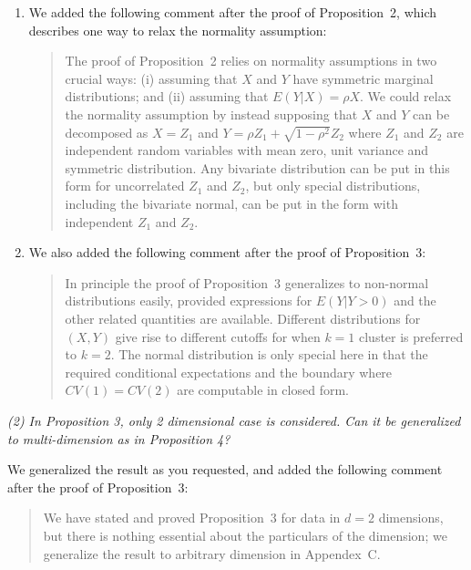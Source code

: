 \documentclass[11pt]{article}
\begin{document}
\begin{enumerate}
\item We added the following comment after the proof of Proposition~2, which
describes one way to relax the normality assumption:

\begin{quote}
The proof of Proposition~2 relies on normality assumptions
in two crucial ways: (i) assuming that $X$ and $Y$ have symmetric marginal
distributions; and (ii) assuming that $E(Y|X) = \rho X$. We could relax the
normality assumption by instead supposing that $X$ and $Y$ can be decomposed
as $X = Z_1$ and $Y = \rho Z_1 + \sqrt{1-\rho^2}Z_2$ where $Z_1$ and $Z_2$ are
independent random variables with mean zero, unit variance and symmetric
distribution. Any bivariate distribution can be put in this form for
uncorrelated $Z_1$ and $Z_2$, but only special distributions, including the
bivariate normal, can be put in the form with independent $Z_1$ and $Z_2$.
\end{quote}

\item We also added the following comment after the proof of Proposition~3:

\begin{quote}
In principle the proof of Proposition~3 generalizes to non-normal
distributions easily, provided expressions for $E(Y | Y > 0)$ and the other
related quantities are available. Different distributions for $(X,Y)$ give
rise to different cutoffs for when $k = 1$ cluster is preferred to $k = 2$.
The normal distribution is only special here in that the required conditional
expectations and the boundary where $CV(1) = CV(2)$ are computable in closed
form. 
\end{quote}

\end{enumerate}


\emph{(2) In Proposition 3, only 2 dimensional case is considered. Can
it be generalized to multi-dimension as in Proposition 4?}

We generalized the result as you requested, and added the following
comment after the proof of Proposition~3:

\begin{quote}
We have stated and proved Proposition~3 for data in $d = 2$
dimensions, but there is nothing essential about the particulars of the
dimension; we generalize the result to arbitrary dimension in
Appendex~C.
\end{quote}
\end{document}
